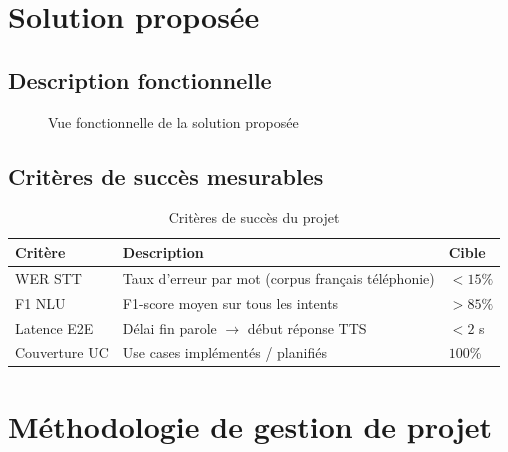 \section{Solution proposée}

\subsection{Description fonctionnelle}


\begin{figure}[H]
  \centering
  
  \caption{Vue fonctionnelle de la solution proposée}
  \label{fig:solution_fonctionnelle}
\end{figure}

\subsection{Critères de succès mesurables}

\begin{table}[H]
  \centering
  \caption{Critères de succès du projet}
  \label{tab:criteres_succes}
  \begin{tabularx}{0.85\textwidth}{lXl}
    \toprule
    \textbf{Critère} & \textbf{Description} & \textbf{Cible} \\
    \midrule
    WER \ac{STT}  & Taux d'erreur par mot (corpus français téléphonie) & $< 15\%$ \\
    F1 \ac{NLU}   & F1-score moyen sur tous les intents & $> 85\%$ \\
    Latence E2E   & Délai fin parole $\rightarrow$ début réponse \ac{TTS} & $< 2$ s \\
    Couverture UC & Use cases implémentés / planifiés & $100\%$ \\
    \bottomrule
  \end{tabularx}
\end{table}

\section{Méthodologie de gestion de projet}

